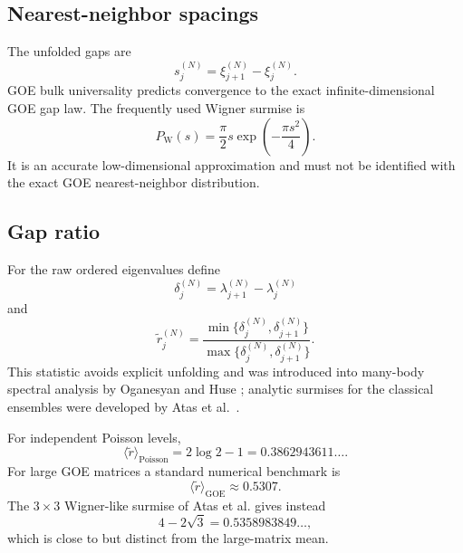\documentclass[11pt]{amsart}
\numberwithin{equation}{section}
\theoremstyle{plain}
\theoremstyle{definition}
\theoremstyle{remark}
\newcommand{\GOE}{\mathrm{GOE}}
\newcommand{\Poisson}{\mathrm{Poisson}}
\begin{document}
\subsection{Nearest-neighbor spacings}
\label{subsec:nearest_neighbor}

The unfolded gaps are
\begin{equation}
s_j^{(N)}=\xi_{j+1}^{(N)}-\xi_j^{(N)}.
\label{eq:unfolded_gap}
\end{equation}
GOE bulk universality predicts convergence to the exact infinite-dimensional GOE gap law.  The frequently used Wigner surmise is
\begin{equation}
P_{\mathrm W}(s)
=
\frac{\pi}{2}s\exp\!\left(-\frac{\pi s^2}{4}\right).
\label{eq:wigner_surmise}
\end{equation}
It is an accurate low-dimensional approximation and must not be identified with the exact GOE nearest-neighbor distribution.

\subsection{Gap ratio}
\label{subsec:gap_ratio}

For the raw ordered eigenvalues define
\begin{equation}
\delta_j^{(N)}=\lambda_{j+1}^{(N)}-\lambda_j^{(N)}
\label{eq:raw_gap}
\end{equation}
and
\begin{equation}
\widetilde r_j^{(N)}
=
\frac{\min\{\delta_j^{(N)},\delta_{j+1}^{(N)}\}}
{\max\{\delta_j^{(N)},\delta_{j+1}^{(N)}\}}.
\label{eq:ratio_statistic}
\end{equation}
This statistic avoids explicit unfolding and was introduced into many-body spectral analysis by Oganesyan and Huse \cite{OganesyanHuse2007}; analytic surmises for the classical ensembles were developed by Atas et al.\ \cite{Atas2013}.

For independent Poisson levels,
\begin{equation}
\langle\widetilde r\rangle_{\Poisson}
=2\log 2-1
=0.3862943611\ldots.
\label{eq:poisson_gap_ratio}
\end{equation}
For large GOE matrices a standard numerical benchmark is
\begin{equation}
\langle\widetilde r\rangle_{\GOE}\approx0.5307.
\label{eq:goe_gap_ratio}
\end{equation}
The $3\times3$ Wigner-like surmise of Atas et al. gives instead
\begin{equation}
4-2\sqrt3=0.5358983849\ldots,
\label{eq:atas_gap_ratio}
\end{equation}
which is close to but distinct from the large-matrix mean.
\end{document}
